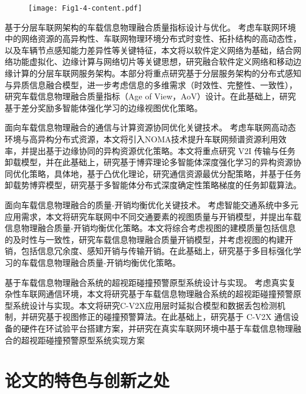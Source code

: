 \begin{figure}[h] 
	\centering
	\texttt{[image: Fig1-4-content.pdf]}
	\label{fig 1-4}
\end{figure}

 基于分层车联网架构的车载信息物理融合质量指标设计与优化。
考虑车联网环境中的网络资源的高异构性、车联网物理环境分布式时变性、拓扑结构的高动态性，以及车辆节点感知能力差异性等关键特征，本文将以软件定义网络为基础，结合网络功能虚拟化、边缘计算与网络切片等关键思想，研究融合软件定义网络和移动边缘计算的分层车联网服务架构。本部分将重点研究基于分层服务架构的分布式感知与异质信息融合模型，进一步考虑信息的多维需求（时效性、完整性、一致性），研究车载信息物理融合质量指标（Age of View，AoV）设计。在此基础上，研究基于差分奖励多智能体强化学习的边缘视图优化策略。

 面向车载信息物理融合的通信与计算资源协同优化关键技术。
考虑车联网高动态环境与高异构分布式资源，本文将引入NOMA技术提升车联网频谱资源利用效率，并提出基于边缘协同的异构资源优化策略。本文将重点研究 V2I 传输与任务卸载模型，并在此基础上，研究基于博弈理论多智能体深度强化学习的异构资源协同优化策略，具体地，基于凸优化理论，研究通信资源最优分配策略，并基于任务卸载势博弈模型，研究基于多智能体分布式深度确定性策略梯度的任务卸载算法。

 面向车载信息物理融合的质量-开销均衡优化关键技术。
考虑智能交通系统中多元应用需求，本文将研究车联网中不同交通要素的视图质量与开销模型，并提出车载信息物理融合质量-开销均衡优化策略。本文将综合考虑视图的建模质量包括信息的及时性与一致性，研究车载信息物理融合质量开销模型，并考虑视图的构建开销，包括信息冗余度、感知开销与传输开销。在此基础上，研究基于多目标强化学习的车载信息物理融合质量-开销均衡优化策略。

 基于车载信息物理融合系统的超视距碰撞预警原型系统设计与实现。
考虑真实复杂性车联网通信环境，本文将研究基于车载信息物理融合系统的超视距碰撞预警原型系统设计与实现。本文将研究C-V2X应用层时延拟合模型和数据丢包检测机制，并研究基于视图修正的碰撞预警算法。在此基础上，研究基于 C-V2X 通信设备的硬件在环试验平台搭建方案，并研究在真实车联网环境中基于车载信息物理融合的超视距碰撞预警原型系统实现方案

\section{论文的特色与创新之处}\label{section 1-6}

